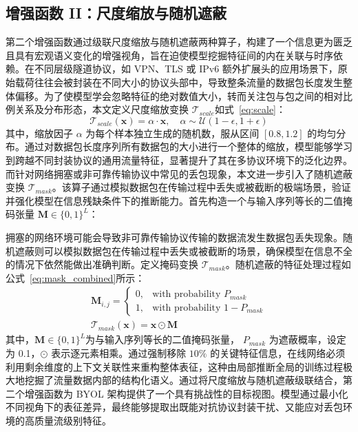 \subsection{增强函数 II：尺度缩放与随机遮蔽}
第二个增强函数通过级联尺度缩放与随机遮蔽两种算子，构建了一个信息更为匮乏且具有宏观语义变化的增强视角，旨在迫使模型挖掘特征间的内在关联与时序依赖。在不同层级隧道协议，如 VPN、TLS 或 IPv6 额外扩展头的应用场景下，原始载荷往往会被封装在不同大小的协议头部中，导致整条流量的数据包长度发生整体偏移。为了使模型学会忽略特征的绝对数值大小，转而关注包与包之间的相对比例关系及分布形态，本文定义尺度缩放变换 $\mathcal{T}_{scale}$如式~\ref{eq:scale}：
\begin{equation}
  \mathcal{T}_{scale}(\mathbf{x}) = \alpha \cdot \mathbf{x}, \quad \alpha \sim \mathcal{U}(1-\epsilon, 1+\epsilon)
  \label{eq:scale}
\end{equation}
其中，缩放因子 $\alpha$ 为每个样本独立生成的随机数，服从区间 $[0.8, 1.2]$ 的均匀分布。通过对数据包长度序列所有数据包的大小进行一个整体的缩放，模型能够学习到跨越不同封装协议的通用流量特征，显著提升了其在多协议环境下的泛化边界。而针对网络拥塞或非可靠传输协议中常见的丢包现象，本文进一步引入了随机遮蔽变换 $\mathcal{T}_{mask}$。该算子通过模拟数据包在传输过程中丢失或被截断的极端场景，验证并强化模型在信息残缺条件下的推断能力。首先构造一个与输入序列等长的二值掩码张量 $\mathbf{M} \in \{0, 1\}^{L}$：

拥塞的网络环境可能会导致非可靠传输协议传输的数据流发生数据包丢失现象。随机遮蔽则可以模拟数据包在传输过程中丢失或被截断的场景，确保模型在信息不全的情况下依然能做出准确判断。定义掩码变换 $\mathcal{T}_{mask}$。随机遮蔽的特征处理过程如公式~\ref{eq:mask_combined}所示：
\begin{equation}
    \begin{gathered}
        \mathbf{M}_{i,j} = \begin{cases} 0, & \text{with probability } P_{mask} \\ 1, & \text{with probability } 1 - P_{mask} \end{cases} \\
        \mathcal{T}_{mask}(\mathbf{x}) = \mathbf{x} \odot \mathbf{M}
    \end{gathered}
    \label{eq:mask_combined}
\end{equation}
其中，$\mathbf{M} \in \{0, 1\}^{L}$为与输入序列等长的二值掩码张量， $P_{mask}$ 为遮蔽概率，设定为 0.1，$\odot$ 表示逐元素相乘。通过强制移除 $10\%$ 的关键特征信息，在线网络必须利用剩余维度的上下文关联性来重构整体表征，这种由局部推断全局的训练过程极大地挖掘了流量数据内部的结构化语义。通过将尺度缩放与随机遮蔽级联结合，第二个增强函数为 BYOL 架构提供了一个具有挑战性的目标视图。模型通过最小化不同视角下的表征差异，最终能够提取出既能对抗协议封装干扰、又能应对丢包环境的高质量流级别特征。

